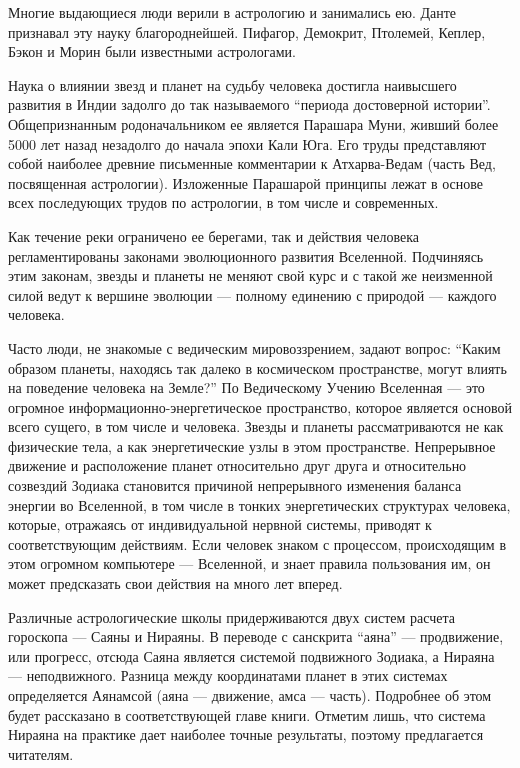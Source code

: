Многие выдающиеся люди верили в астрологию и занимались ею. Данте признавал эту науку благороднейшей. Пифагор, Демокрит, Птолемей, Кеплер, Бэкон и Морин были известными астрологами.

Наука о влиянии звезд и планет на судьбу человека достигла наивысшего развития в Индии задолго до так называемого ``периода достоверной истории''. Общепризнанным родоначальником ее является Парашара Муни, живший более 5000 лет назад незадолго до начала эпохи Кали Юга. Его труды представляют собой наиболее древние письменные комментарии к Атхарва-Ведам (часть Вед, посвященная астрологии). Изложенные Парашарой принципы лежат в основе всех последующих трудов по астрологии, в том числе и современных.

Как течение реки ограничено ее берегами, так и действия человека регламентированы законами эволюционного развития Вселенной. Подчиняясь этим законам, звезды и планеты не меняют свой курс и с такой же неизменной силой ведут к вершине эволюции --- полному единению с природой --- каждого человека.

Часто люди, не знакомые с ведическим мировоззрением, задают вопрос: ``Каким образом планеты, находясь так далеко в космическом пространстве, могут влиять на поведение человека на Земле?'' По Ведическому Учению Вселенная --- это огромное информационно-энергетическое пространство, которое является основой всего сущего, в том числе и человека. Звезды и планеты рассматриваются не как физические тела, а как энергетические узлы в этом пространстве. Непрерывное движение и расположение планет относительно друг друга и относительно созвездий Зодиака становится причиной непрерывного изменения баланса энергии во Вселенной, в том числе в тонких энергетических структурах человека, которые, отражаясь от индивидуальной нервной системы, приводят к соответствующим действиям. Если человек знаком с процессом, происходящим в этом огромном компьютере --- Вселенной, и знает правила пользования им, он может предсказать свои действия на много лет вперед.

Различные астрологические школы придерживаются двух систем расчета гороскопа --- Саяны и Нираяны. В переводе с санскрита ``аяна'' --- продвижение, или прогресс, отсюда Саяна является системой подвижного Зодиака, а Нираяна --- неподвижного. Разница между координатами планет в этих системах определяется Аянамсой (аяна --- движение, амса --- часть). Подробнее об этом будет рассказано в соответствующей главе книги. Отметим лишь, что система Нираяна на практике дает наиболее точные результаты, поэтому предлагается читателям.

